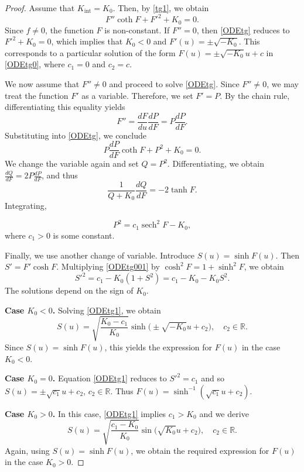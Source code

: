 \documentclass[10pt,a4paper]{amsart}
\def\r{\mathbb R}
\DeclareMathOperator{\sech}{sech}
\begin{document}
\begin{proof}
Assume that $K_{\mathrm{int}}=K_0$. Then, by \eqref{tg1}, we obtain
\begin{equation}\label{ODEtg}
F''\coth F+F'^2+K_0=0.
\end{equation}
Since $f\neq 0$, the function $F$ is non-constant. If $F''=0$, then \eqref{ODEtg} reduces to $F'^2+K_0=0$, which implies that $K_0<0$ and $F'(u)=\pm\sqrt{-K_0}$. This corresponds to a particular solution of the form $F(u)=\pm\sqrt{-K_0}u+c$ in \eqref{ODEtg0}, where $c_1=0$ and $c_2=c$.

We now assume that $F''\neq 0$ and proceed to solve \eqref{ODEtg}. Since $F''\neq 0$, we may treat the function $F'$ as a variable. Therefore, we set $F'=P$. By the chain rule, differentiating this equality yields
$$F''=\frac{dF}{du}\frac{dP}{dF}=P\frac{dP}{dF}.$$ 
Substituting into \eqref{ODEtg}, we conclude
$$
P\frac{dP}{dF}\coth F+P^2+K_0=0.
$$
We change the variable again and set $Q=P^2$. Differentiating, we obtain $\frac{dQ}{dF}=2P\frac{dP}{dF}$, and thus
$$
\frac{1}{Q+K_0}\frac{dQ}{dF}=-2\tanh F.
$$
Integrating,

\begin{equation}\label{ODEtg001}
P^2=c_1\sech^2F-K_0,
\end{equation}
where $c_1>0$ is some constant.

Finally, we use another change of variable. Introduce $S(u)=\sinh F(u)$. Then $S'=F'\cosh F$. Multiplying \eqref{ODEtg001} by $\cosh^2 F=1+\sinh^2 F$, we obtain
\begin{equation}\label{ODEtg1}
S'^2=c_1-K_0(1+S^2)=c_1-K_0-K_0S^2.
\end{equation}
The solutions depend on the sign of $K_0$.

\textbf{Case $K_0<0$.} Solving \eqref{ODEtg1}, we obtain
$$
S(u)=\sqrt{\frac{K_0-c_1}{K_0}}\sinh \big (\pm\sqrt{-K_0}u+c_2 \big ), \quad c_2\in \r.
$$
Since $S(u)=\sinh F(u)$, this yields the expression for $F(u)$ in the case $K_0<0$.

\textbf{Case $K_0=0$.} Equation \eqref{ODEtg1} reduces to $S'^2=c_1$ and so $S(u)=\pm \sqrt{c_1}u+c_2$, $c_2\in \r.$ Thus $F(u)=\sinh^{-1}(\sqrt{c_1}u+c_2)$. 

\textbf{Case $K_0>0$.} In this case, \eqref{ODEtg1} implies $c_1>K_0$ and we derive
$$
S(u)=\sqrt{\frac{c_1-K_0}{K_0}}\sin \big (\sqrt{K_0}u+c_2 \big ), \quad c_2\in \r.
$$
Again, using $S(u)=\sinh F(u)$, we obtain the required expression for $F(u)$ in the case $K_0>0$.
\end{proof}
\end{document}
